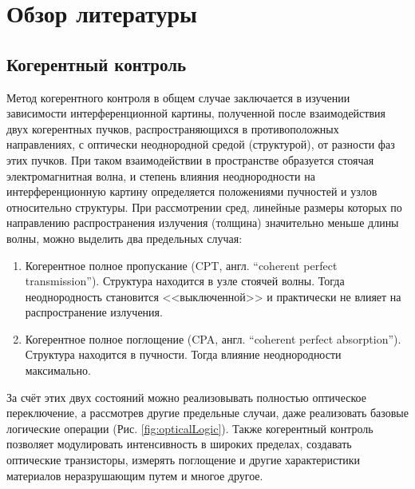 \chapter*{Обзор литературы}

\section{Когерентный контроль}

Метод когерентного контроля в общем случае заключается в изучении зависимости интерференционной картины, полученной после взаимодействия двух когерентных пучков, распространяющихся в противоположных направлениях, с оптически неоднородной средой (структурой), от разности фаз этих пучков. При таком взаимодействии в пространстве образуется стоячая электромагнитная волна, и степень влияния неоднородности на интерференционную картину определяется положениями пучностей и узлов относительно структуры. При рассмотрении сред, линейные размеры которых по направлению распространения излучения (толщина) значительно меньше длины волны, можно выделить два предельных случая:
\begin{enumerate}
    \item Когерентное полное пропускание (CPT, англ. ``coherent perfect transmission''). Структура находится в узле стоячей волны. Тогда неоднородность становится <<выключенной>> и практически не влияет на распространение излучения.
    \item Когерентное полное поглощение (CPA, англ. ``coherent perfect absorption''). Структура находится в пучности. Тогда влияние неоднородности максимально.
\end{enumerate}
За счёт этих двух состояний можно реализовывать полностью оптическое переключение, а рассмотрев другие предельные случаи, даже реализовать базовые логические операции (Рис. \ref{fig:opticalLogic})\cite{twoDimensional2016}. Также когерентный контроль позволяет модулировать интенсивность в широких пределах\cite{lightWithLight2012}, создавать оптические транзисторы\cite{lightWithLight2015}, измерять поглощение и другие характеристики материалов неразрушающим путем\cite{CPAGraphene2017} и многое другое.

